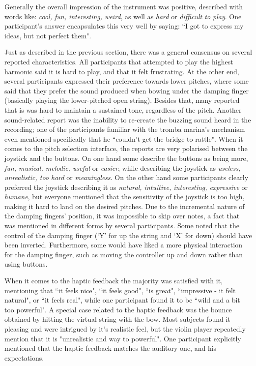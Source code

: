 \documentclass[dvipsnames, pdftex]{article}
\begin{document}
Generally the overall impression of the instrument was positive, described with words like: \textit{cool, fun, interesting, weird}, as well as \textit{hard} or \textit{difficult to play}. One participant's answer encapsulates this very well by saying: ``I got to express my ideas, but not perfect them". 

Just as described in the previous section, there was a general consensus on several reported characteristics. All participants that attempted to play the highest harmonic said it is hard to play, and that it felt frustrating. At the other end, several participants expressed their preference towards lower pitches, where some said that they prefer the sound produced when bowing under the damping finger (basically playing the lower-pitched open string). Besides that, many reported that is was hard to maintain a sustained tone, regardless of the pitch. Another sound-related report was the inability to re-create the buzzing sound heard in the recording; one of the participants familiar with the tromba marina's mechanism even mentioned specifically that he ``couldn't get the bridge to rattle". When it comes to the pitch selection interface, the reports are very polarised between the joystick and the buttons. On one hand some describe the buttons as being more, \textit{fun, musical, melodic, useful} or \textit{easier}, while describing the joystick as \textit{useless, unrealistic, too hard} or \textit{meaningless}. On the other hand some participants clearly preferred the joystick describing it as \textit{natural, intuitive, interesting, expressive} or \textit{humane}, but everyone mentioned that the sensitivity of the joystick is too high, making it hard to land on the desired pitches. Due to the incremental nature of the damping fingers' position, it was impossible to skip over notes, a fact that was mentioned in different forms by several participants. Some noted that the control of the damping finger (`Y' for up the string and `X' for down) should have been inverted. Furthermore, some would have liked a more physical interaction for the damping finger, such as moving the controller up and down rather than using buttons.

When it comes to the haptic feedback the majority was satisfied with it, mentioning that ``it feels nice", ``it feels good", ``is great", ``impressive - it felt natural", or ``it feels real", while one participant found it to be ``wild and a bit too powerful". A special case related to the haptic feedback was the bounce obtained by hitting the virtual string with the bow. Most subjects found it pleasing and were intrigued by it's realistic feel, but the violin player repeatedly mention that it is "unrealistic and way to powerful". One participant explicitly mentioned that the haptic feedback matches the auditory one, and his expectations.
\end{document}
